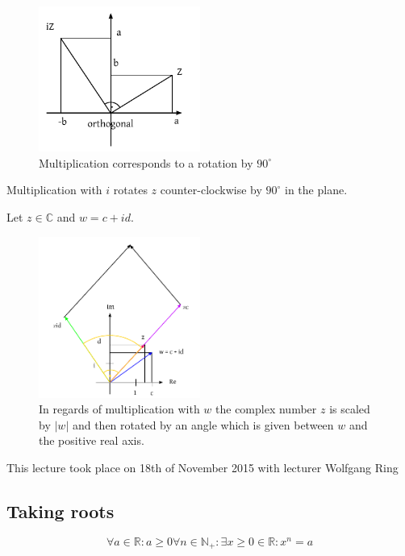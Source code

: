 \documentclass[a4paper,landscape,twocolumn]{article}
\theoremstyle{definition}
\newcommand\abs[1]{\left|#1\right|}
\newcommand\meta[3]{\begin{mdframed}[skipbelow=4pt,skipabove=4pt,innermargin=1pt,innerleftmargin=1pt,innerrightmargin=1pt]\begin{center}\small{\textdownarrow{} This #1 took place on #2 with lecturer #3}\end{center}\end{mdframed}}
\begin{document}
\begin{figure}[!h]
  \begin{center}
    \includegraphics[width=200px]{img/complex_number_multiplication.pdf}
    \caption{Multiplication corresponds to a rotation by $90^\circ$}
  \end{center}
\end{figure}

Multiplication with $i$ rotates $z$ counter-clockwise by $90^\circ$
in the plane.

Let $z \in \mathbb C$ and $w = c + id$.

\begin{figure}[!h]
  \begin{center}
    \includegraphics[width=200px]{img/complex_numbers_multiplication_with_b.pdf}
    \caption{
      In regards of multiplication with $w$ the complex number $z$ is scaled by $\abs{w}$
      and then rotated by an angle which is given between $w$ and the positive real axis.
    }
  \end{center}
\end{figure}

\meta{lecture}{18th of November 2015}{Wolfgang Ring}

\subsection{Taking roots}
%
\[ \forall a \in \mathbb R: a \geq 0 \forall n \in \mathbb N_+: \exists x \geq 0 \in \mathbb R: x^n = a \]
\end{document}
